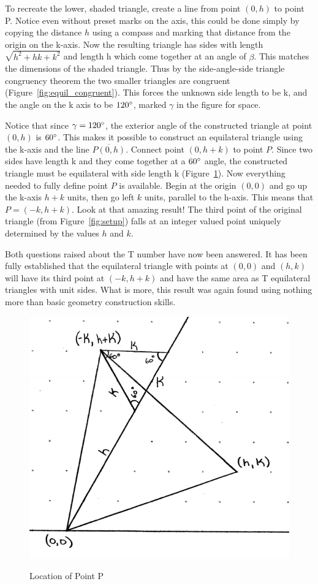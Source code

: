 \documentclass[12pt,letter]{article}
\begin{document}
To recreate the lower, shaded triangle, create a line from point $(0,h)$ to point P. Notice even without preset marks on the axis, this could be done simply by copying the distance $h$ using a compass and marking that distance from the origin on the k-axis. Now the resulting triangle has sides with length $\sqrt{h^2 + hk + k^2}$ and length h which come together at an angle of $\beta$. This matches the dimensions of the shaded triangle. Thus by the side-angle-side triangle congruency theorem the two smaller triangles are congruent (Figure~\ref{fig:equil_congruent}). This forces the unknown side length to be k, and the angle on the k axis to be $120\degree$, marked $\gamma$ in the figure for space.
	
Notice that since $\gamma=120\degree$, the exterior angle of the constructed triangle at point $(0,h)$ is $60\degree$. This makes it possible to construct an equilateral triangle using the k-axis and the line $\overline{P(0,h)}$. Connect point $(0,h+k)$ to point $P$. Since two sides have length k and they come together at a $60\degree$ angle, the constructed triangle must be equilateral with side length k (Figure~\ref{fig:equil_mini}). Now everything needed to fully define point $P$ is available. Begin at the origin $(0,0)$ and go up the k-axis $h+k$ units, then go left $k$ units, parallel to the h-axis. This means that $P=(-k,h+k)$. Look at that amazing result! The third point of the original triangle (from Figure~\ref{fig:setup}) falls at an integer valued point uniquely determined by the values $h$ and $k$. 
	
Both questions raised about the T number have now been answered. It has been fully established that the equilateral triangle with points at $(0,0)$ and $(h,k)$ will have its third point at $(-k, h+k)$ and have the same area as T equilateral triangles with unit sides. What is more, this result was again found using nothing more than basic geometry construction skills.
	
\begin{figure}[h]
	\centering
	\caption{Location of Point P}
	\includegraphics[width=.45\textwidth]{ddagger_end.pdf}
	\label{fig:equil_mini}
\end{figure}
\end{document}
